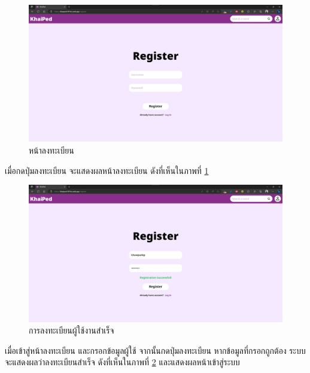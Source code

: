 \documentclass[12pt,oneside,openright,a4paper]{cpe-thai-project}
\begin{document}
\pagebreak
\begin{figure}[!h]\centering
	\includegraphics[width=\textwidth, keepaspectratio=true]{image/chap4/UI/login/register.png}
	\caption{{หน้าลงทะเบียน}}\label{fig:chap4UIRegister}
\end{figure}
\hspace{1cm}
เมื่อกดปุ่มลงทะเบียน จะแสดงผลหน้าลงทะเบียน ดังที่เห็นในภาพที่ \ref{fig:chap4UIRegister}

\begin{figure}[!h]\centering
	\includegraphics[width=\textwidth, keepaspectratio=true]{image/chap4/UI/login/register success.png}
	\caption{{การลงทะเบียนผู้ใช้งานสำเร็จ}}\label{fig:chap4UIRegisterSuccess}
\end{figure}
\hspace{1cm}
เมื่อเข้าสู่หน้าลงทะเบียน และกรอกข้อมูลผู้ใช้ จากนั้นกดปุ่มลงทะเบียน หากข้อมูลที่กรอกถูกต้อง ระบบจะแสดงผลว่าลงทะเบียนสำเร็จ
ดังที่เห็นในภาพที่ \ref{fig:chap4UIRegisterSuccess} และแสดงผลหน้าเข้าสู่ระบบ
\end{document}
